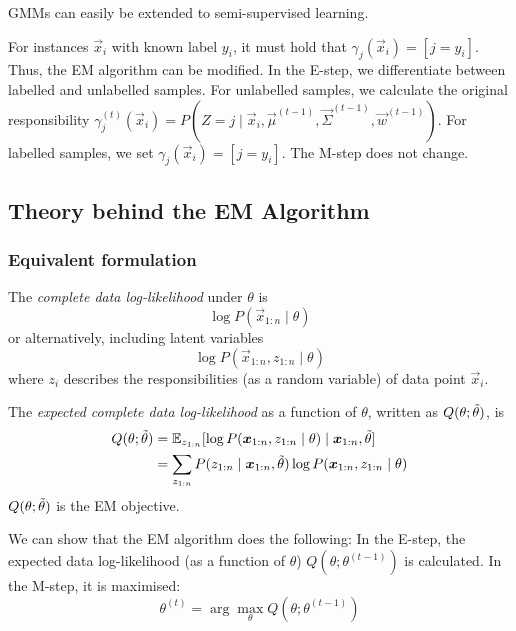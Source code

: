 GMMs can easily be extended to
semi-supervised learning.

For instances $\vec{x}_i$ with known
label $y_i$, it must hold that
$\gamma_j(\vec{x}_i) = [j = y_i]$.
Thus, the EM algorithm can be modified.
In the E-step, we differentiate between
labelled and unlabelled samples.
For unlabelled samples,
we calculate the original responsibility
$\gamma_j^{(t)}(\vec{x}_i) = P(Z = j \mid \vec{x}_i, \vec{\mu}^{(t - 1)}, \vec{\Sigma}^{(t - 1)}, \vec{w}^{(t - 1)})$.
For labelled samples, we set $\gamma_j(\vec{x}_i) = [j = y_i]$.
The M-step does not change.


\subsection{Theory behind the EM Algorithm}
\subsubsection{Equivalent formulation}
The \emph{complete data log-likelihood} under $\theta$ is
\begin{equation*}
    \log{P(\vec{x}_{1:n} \mid \theta)}
\end{equation*}
or alternatively, including latent variables
\begin{equation*}
    \log{P(\vec{x}_{1:n}, z_{1:n} \mid \theta)}
\end{equation*}
where $z_i$ describes the responsibilities
(as a random variable)
of data point $\vec{x}_i$.

The \emph{expected complete data log-likelihood}
as a function of $\theta$,
written as $Q(\theta; \Tilde{\theta})$, is
\begin{align*}
    Q(\theta; \Tilde{\theta}) &=
    \mathbb{E}_{z_{1:n}}[
        \log{P(\vec{x}_{1:n}, z_{1:n} \mid \theta)} \mid \vec{x}_{1:n}, \Tilde{\theta}
    ] \\
    &= \sum_{z_{1:n}}{
        P(z_{1:n} \mid \vec{x}_{1:n}, \Tilde{\theta}) \log{P(\vec{x}_{1:n}, z_{1:n} \mid \theta)}
    }
\end{align*}
$Q(\theta; \Tilde{\theta})$ is the EM objective.

We can show that the EM algorithm does the following:
In the E-step, the expected data log-likelihood
(as a function of $\theta$) $Q(\theta; \theta^{(t-1)})$
is calculated.
In the M-step, it is maximised:
\begin{equation*}
    \theta^{(t)} = \arg\max_\theta{Q(\theta; \theta^{(t-1)})}
\end{equation*}

